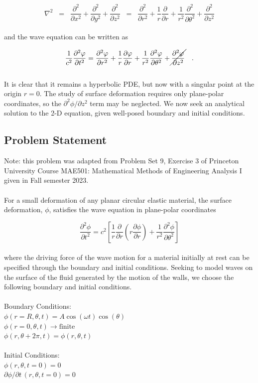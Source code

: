 \documentclass{homework}
\begin{document}
\[ \nabla^2 \;\; = \;\; \frac{\partial^2}{\partial x^2} + \frac{\partial^2}{\partial y^2} + \frac{\partial^2}{\partial z^2} \;\; = \;\; \frac{\partial^2}{\partial r^2} + \frac{1}{r} \frac{\partial}{\partial r} + \frac{1}{r^2} \frac{\partial^2}{\partial \theta^2} + \frac{\partial^2}{\partial z^2} \]
\\ \noindent
and the wave equation can be written as

\[ \frac{1}{c^2} \frac{\partial^2 \phi }{\partial t^2 } = \frac{\partial^2 \phi }{\partial r^2 } + \frac{1}{r} \frac{\partial \phi }{\partial r} + \frac{1}{r^2 } \frac{\partial^2 \phi }{\partial \theta^2 } + \cancel{\frac{\partial^2 \phi }{\partial z^2 }} \quad .\]
\\ \noindent
It is clear that it remains a hyperbolic PDE, but now with a singular point at the origin $r = 0$. The study of surface deformation requires only plane-polar coordinates, so the $\partial^2 \phi / \partial z^2$ term may be neglected. We now seek an analytical solution to the 2-D equation, given well-posed boundary and initial conditions.

\newpage
\subsection{\textbf{Problem Statement}}
\noindent Note: this problem was adapted from Problem Set 9, Exercise 3 of Princeton University Course MAE501: Mathematical Methods of Engineering Analysis I given in Fall semester 2023.
\\ \\
\noindent For a small deformation of any planar circular elastic material, the surface deformation, $\phi$, satisfies the wave equation in plane-polar coordinates

\[ \frac{\partial^2 \phi}{\partial t^2} = c^2 \left[ \frac{1}{r} \frac{\partial}{\partial r} \left(r \frac{\partial \phi}{\partial r}\right) + \frac{1}{r^2} \frac{\partial^2 \phi}{\partial \theta^2} \right]\]
\\
\noindent where the driving force of the wave motion for a material initially at rest can be specified through the boundary and initial conditions. Seeking to model waves on the surface of the fluid generated by the motion of the walls, we choose the following boundary and initial conditions. \\ \\
\noindent Boundary Conditions: \\
$ \phi(r=R, \theta, t) = A \cos(\omega t) \cos (\theta) $ \\
$ \phi(r=0, \theta, t) \rightarrow \textrm{finite} $ \\
$ \phi(r, \theta + 2\pi, t) = \phi(r, \theta, t) $ \\ \\
\noindent Initial Conditions: \\
$ \phi(r, \theta, t=0) = 0 $ \\
$ \partial \phi/ \partial t \, (r, \theta, t=0) = 0 $
\end{document}
